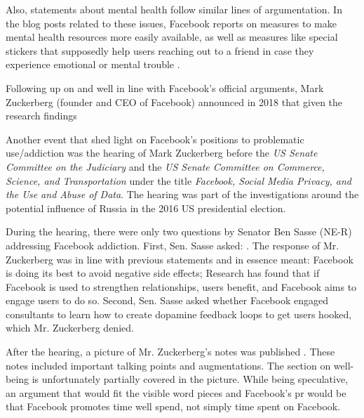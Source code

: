Also, statements about mental health follow similar lines of argumentation.
In the blog posts related to these issues, Facebook reports on measures to make mental health resources more easily available, as well as measures like special stickers that supposedly help users reaching out to a friend in case they experience emotional or mental trouble \citep{davis_connecting_2017, facebook_connecting_2020, facebook_making_2021}.

Following up on \citep{ginsberg_hard_2017} and well in line with Facebook's official arguments, Mark Zuckerberg (foun\-der and CEO of Facebook) announced in 2018 that given the research findings  \citep{zuckerberg_one_2018}

Another event that shed light on Facebook's positions to problematic use/addiction was the hearing of Mark Zuckerberg before the \textit{US Senate Committee on the Judiciary} and the \emph{US Senate Committee on Commerce, Science, and Transportation} under the title \emph{Facebook, Social Media Privacy, and the Use and Abuse of Data}.
The hearing was part of the investigations around the potential influence of Russia in the 2016 US presidential election.

During the hearing, there were only two questions by Senator Ben Sasse (NE-R) addressing Facebook addiction. 
First, Sen. Sasse asked:  \citep[at 3:15:40]{noauthor_facebook_2018}.
The response of Mr. Zuckerberg was in line with previous statements and in essence meant:
Facebook is doing its best to avoid negative side effects; Research has found that if Facebook is used to strengthen relationships, users benefit, and Facebook aims to engage users to do so.
Second, Sen. Sasse asked whether Facebook engaged consultants to learn how to create dopamine feedback loops to get users hooked, which Mr. Zuckerberg denied.

After the hearing, a picture of Mr. Zuckerberg's notes was published \citep{stefan_becket_photo_2018}.
These notes included important talking points and augmentations. 
The section on well-being is unfortunately partially covered in the picture. 
While being speculative, an argument that would fit the visible word pieces and Facebook's \gls{pr} would be that Facebook promotes time well spend, not simply time spent on Facebook. 

